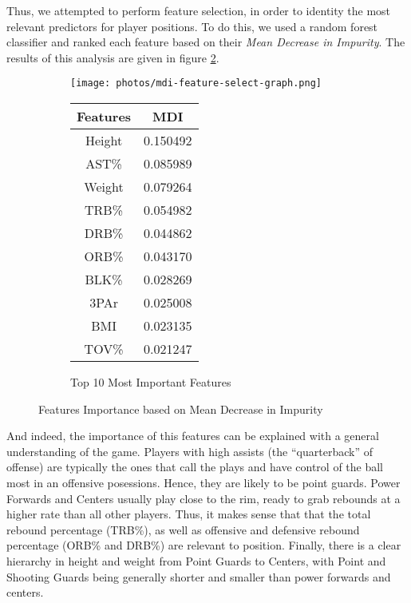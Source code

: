 \documentclass[./main.tex]{subfiles}
\begin{document}
Thus, we attempted to perform feature selection, in order to identity the most relevant predictors for player positions. To do this, we used a random forest classifier and ranked each feature based on their \textit{Mean Decrease in Impurity}. The results of this analysis are given in figure \ref{fig:feature-selection}.
\begin{figure}[h!]\centering
\begin{subfigure}{.45\textwidth}
    \texttt{[image: photos/mdi-feature-select-graph.png]}
\end{subfigure}
\begin{subfigure}{.45\textwidth}\centering
    \begin{tabular}{cc}\toprule
    Features    & MDI     \\\midrule
    Height      & 0.150492\\
    AST\%       & 0.085989\\
    Weight      & 0.079264\\
    TRB\%       & 0.054982\\
    DRB\%       & 0.044862\\
    ORB\%       & 0.043170\\
    BLK\%       & 0.028269\\
    3PAr        & 0.025008\\
    BMI         & 0.023135\\
    TOV\%       & 0.021247\\\bottomrule
    \end{tabular}
    \caption{Top 10 Most Important Features}\label{tab:feature-selection}    
\end{subfigure}
\caption{Features Importance based on Mean Decrease in Impurity}
\label{fig:feature-selection}
\end{figure}

And indeed, the importance of this features can be explained with a general understanding of the game. Players with high assists (the ``quarterback'' of offense) are typically the ones that call the plays and have control of the ball most in an offensive posessions. Hence, they are likely to be point guards. Power Forwards and Centers usually play close to the rim, ready to grab rebounds at a higher rate than all other players. Thus, it makes sense that that the total rebound percentage (TRB\%), as well as offensive and defensive rebound percentage (ORB\% and DRB\%) are relevant to position. Finally, there is a clear hierarchy in height and weight from Point Guards to Centers, with Point and Shooting Guards being generally shorter and smaller than power forwards and centers.
\end{document}
